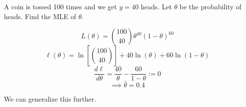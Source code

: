 \begin{exbox}
    \begin{example}
        A coin is tossed 100 times and we get $ y=40 $ heads. Let $ \theta $
        be the probability of heads. Find the MLE of $ \theta $.

        \[ L(\theta)=\binom{100}{40}\theta^{40}(1-\theta)^{60} \]
        \[ \ell(\theta)=\ln\left[ \binom{100}{40} \right]+40\ln(\theta)+60\ln(1-\theta) \]
        \[ \frac{d\ell}{d\theta}=\frac{40}{\theta} -\frac{60}{1-\theta} :=0 \]
        \[ \implies \hat{\theta}=0.4 \]
    \end{example}
\end{exbox}
We can generalize this further.
